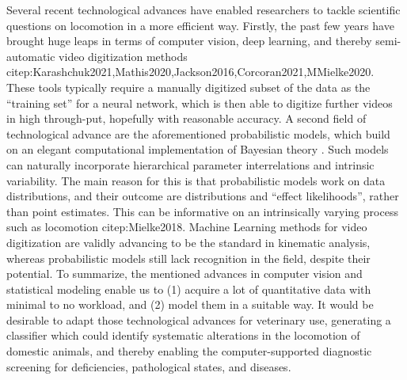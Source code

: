 \documentclass[10pt,a4paper]{article}
\begin{document}
Several recent technological advances have enabled researchers to tackle scientific questions on locomotion in a more efficient way.
Firstly, the past few years have brought huge leaps in terms of computer vision, deep learning, and thereby semi-automatic video digitization methods citep:Karashchuk2021,Mathis2020,Jackson2016,Corcoran2021,MMielke2020.
These tools typically require a manually digitized subset of the data as the ``training set'' for a neural network, which is then able to digitize further videos in high through-put, hopefully with reasonable accuracy.
A second field of technological advance are the aforementioned probabilistic models, which build on an elegant computational implementation of Bayesian theory \citep[Markov Chain Monte Carlo / MCMC sampling, \textit{cf.}][]{McElreath2018,Gelman2013,vandeSchoot2021}.
Such models can naturally incorporate hierarchical parameter interrelations and intrinsic variability.
The main reason for this is that probabilistic models work on data distributions, and their outcome are distributions and ``effect likelihoods'', rather than point estimates.
This can be informative on an intrinsically varying process such as locomotion citep:Mielke2018.
Machine Learning methods for video digitization are validly advancing to be the standard in kinematic analysis, whereas probabilistic models still lack recognition in the field, despite their potential.
To summarize, the mentioned advances in computer vision and statistical modeling enable us to (1) acquire a lot of quantitative data with minimal to no workload, and (2) model them in a suitable way.
It would be desirable to adapt those technological advances for veterinary use, generating a classifier which could identify systematic alterations in the locomotion of domestic animals, and thereby enabling the computer-supported diagnostic screening for deficiencies, pathological states, and diseases.


\bigskip
\end{document}
